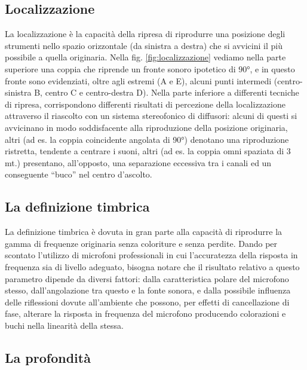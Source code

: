 \subsection{Localizzazione}

La localizzazione è la capacità della ripresa di riprodurre una posizione degli
strumenti nello spazio orizzontale (da sinistra a destra) che si avvicini il più
possibile a quella originaria. Nella fig. \ref{fig:localizzazione} vediamo nella
parte superiore una coppia che riprende un fronte sonoro ipotetico di $90°$, e
in questo fronte sono evidenziati, oltre agli estremi (A e E), alcuni punti
intermedi (centro-sinistra B, centro C e centro-destra D). Nella parte inferiore
a differenti tecniche di ripresa, corrispondono differenti risultati di
percezione della localizzazione attraverso il riascolto con un sistema
stereofonico di diffusori: alcuni di questi si avvicinano in modo soddisfacente
alla riproduzione della posizione originaria, altri (ad es. la coppia coincidente
angolata di 90°) denotano una riproduzione ristretta, tendente a centrare i
suoni, altri (ad es. la coppia omni spaziata di 3 mt.) presentano, all’opposto,
una separazione eccessiva tra i canali ed un conseguente “buco” nel centro
d’ascolto.

\subsection{La definizione timbrica}

La definizione timbrica è dovuta in gran parte alla capacità di riprodurre la
gamma di frequenze originaria senza coloriture e senza perdite. Dando per
scontato l’utilizzo di microfoni professionali in cui l’accuratezza della
risposta in frequenza sia di livello adeguato, bisogna notare che il risultato
relativo a questo parametro dipende da diversi fattori: dalla caratteristica
polare del microfono stesso, dall’angolazione tra questo e la fonte sonora, e
dalla possibile influenza delle riflessioni dovute all’ambiente che possono, per
effetti di cancellazione di fase, alterare la risposta in frequenza del microfono
producendo colorazioni e buchi nella linearità della stessa.

\subsection{La profondità}

